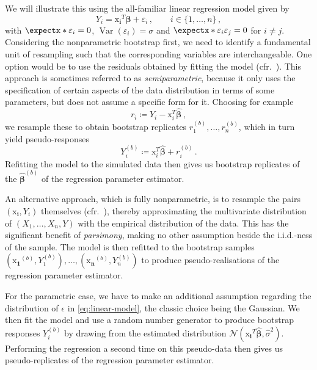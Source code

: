 \documentclass[a4paper]{book}
\begin{document}
We will illustrate this using the all-familiar linear regression model given by
\begin{equation} \label{eq:linear-model}
  Y_i = \bm{\mathrm{x}_i}^T \bm{\beta} + \varepsilon_i \,, \qquad i \in \{ 1, \dots, n \} \,,
\end{equation}
with $\expect{\varepsilon_i} = 0$, $\operatorname{Var}(\varepsilon_i) = \sigma$ and $\expect{\varepsilon_i \varepsilon_j} = 0$ for $i \neq j$. Considering the nonparametric bootstrap first, we need to identify a fundamental unit of resampling such that the corresponding variables are interchangeable. One option would be to use the residuals obtained by fitting the model (cfr.\ \cite[Algorithm 6.1]{davison}). This approach is sometimes referred to as \emph{semiparametric}, because it only uses the specification of certain aspects of the data distribution in terms of some parameters, but does not assume a specific form for it. Choosing for example
\begin{equation}
  r_i \coloneqq Y_i - \bm{\mathrm{x}}^T_i \widehat{\bm{\beta}} \,,
\end{equation}
we resample these to obtain bootstrap replicates $r^{(b)}_1, \dots, r^{(b)}_n$, which in turn yield pseudo-responses
\begin{equation}
  Y_i^{(b)} \coloneqq \bm{\mathrm{x}}^T_i \widehat{\bm{\beta}} + r^{(b)}_i \,.
\end{equation}
Refitting the model to the simulated data then gives us bootstrap replicates of the $\widehat{\bm{\beta}}^{(b)}$ of the regression parameter estimator.

An alternative approach, which is fully nonparametric, is to resample the pairs $(\bm{\mathrm{x}_i}, Y_i)$ themselves (cfr.\ \cites[Section 9.5]{efron:intro}[Algorithm 6.2]{davison}), thereby approximating the multivariate distribution of $(X_1, \dots, X_n, Y)$ with the empirical distribution of the data. This has the significant benefit of \emph{parsimony}, making no other assumption beside the i.i.d.-ness of the sample. The model is then refitted to the bootstrap samples $(\bm{\mathrm{x}_1}^{(b)}, Y^{(b)}_1), \dots, (\bm{\mathrm{x}_n}^{(b)}, Y^{(b)}_n)$ to produce pseudo-realisations of the regression parameter estimator.

For the parametric case, we have to make an additional assumption regarding the distribution of $\epsilon$ in \cref{eq:linear-model}, the classic choice being the Gaussian. We then fit the model and use a random number generator to produce bootstrap responses $Y^{(b)}_i$ by drawing from the estimated distribution $\mathcal{N}(\bm{\mathrm{x}_i}^T \widehat{\bm{\beta}}, \widehat{\sigma}^2)$. Performing the regression a second time on this pseudo-data then gives us pseudo-replicates of the regression parameter estimator.
\end{document}
